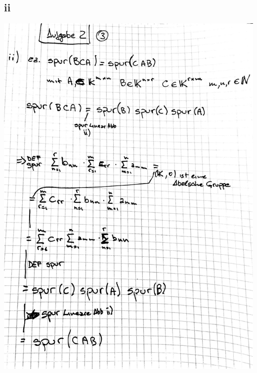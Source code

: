 \documentclass[10pt,a4paper]{article}
\begin{document}
\subsection{ii}
\includegraphics[width=\textwidth]{lat5a_3.jpg} 
\end{document}

